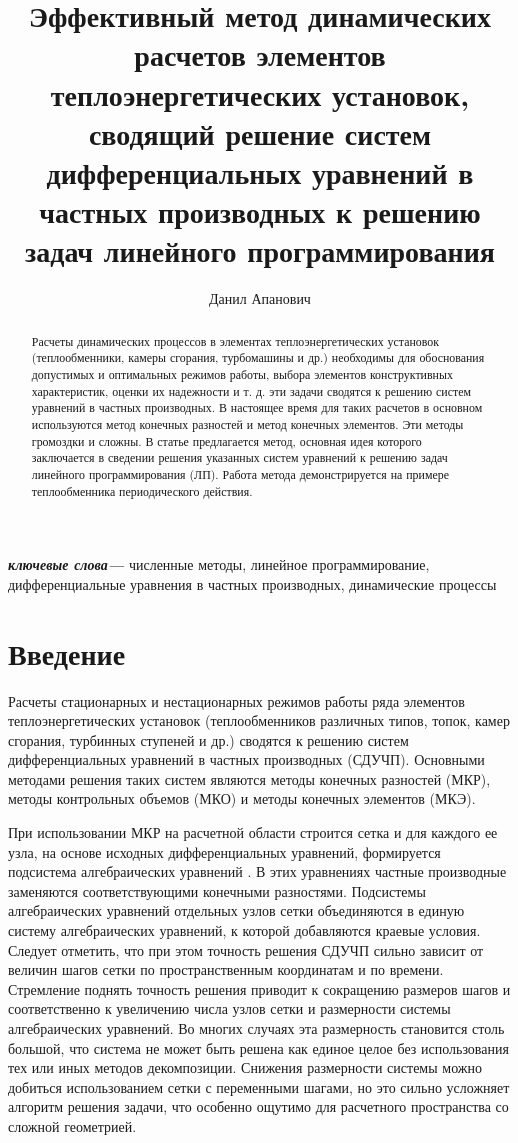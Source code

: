 \documentclass[a4paper,12pt]{article}
\title{Эффективный метод динамических расчетов элементов
теплоэнергетических установок, сводящий решение систем дифференциальных
уравнений в частных производных к решению задач линейного программирования}
\author{Данил Апанович}
\providecommand{\keywords}[1]
{
  \small	
  \textbf{\textit{ключевые слова---}} #1
}
\begin{document}
\maketitle

\begin{abstract}
Расчеты динамических процессов в элементах
теплоэнергетических установок (теплообменники, камеры сгорания,
турбомашины и др.) необходимы для обоснования допустимых и оптимальных
режимов работы, выбора элементов конструктивных характеристик, оценки
их надежности и т. д. эти задачи сводятся к решению систем уравнений в
частных производных. В настоящее время для таких расчетов в основном
используются метод конечных разностей и метод конечных элементов. Эти
методы громоздки и сложны. В статье предлагается метод, основная идея
которого заключается в сведении решения указанных систем уравнений к
решению задач линейного программирования (ЛП). Работа метода
демонстрируется на примере теплообменника периодического действия. 
\end{abstract}

\keywords{численные методы, линейное программирование,
дифференциальные уравнения в частных производных, динамические
процессы}

\section{Введение} 

Расчеты стационарных и нестационарных режимов работы ряда элементов
теплоэнергетических установок (теплообменников различных типов, топок,
камер сгорания, турбинных ступеней и др.) сводятся к решению систем
дифференциальных уравнений в частных производных (СДУЧП). Основными
методами решения таких систем являются методы конечных разностей (МКР),
методы контрольных объемов (МКО) и методы конечных элементов (МКЭ).  

При использовании МКР на расчетной области строится сетка и для
каждого ее узла, на основе исходных дифференциальных уравнений,
формируется подсистема алгебраических уравнений
\cite{SN1978,C2020,S1985,KD2018}. В этих уравнениях частные
производные заменяются соответствующими конечными разностями.
Подсистемы алгебраических уравнений отдельных узлов сетки объединяются
в единую систему алгебраических уравнений, к которой добавляются
краевые условия. Следует отметить, что при этом точность решения СДУЧП
сильно зависит от величин шагов сетки по пространственным координатам
и по времени. Стремление поднять точность решения приводит к
сокращению размеров шагов и соответственно к увеличению числа узлов
сетки и размерности системы алгебраических уравнений. Во многих
случаях эта размерность становится столь большой, что система не может
быть решена как единое целое без использования тех или иных методов
декомпозиции.  Снижения размерности системы можно добиться
использованием сетки с переменными шагами, но это сильно усложняет
алгоритм решения задачи, что особенно ощутимо для расчетного
пространства со сложной геометрией.
\end{document}
